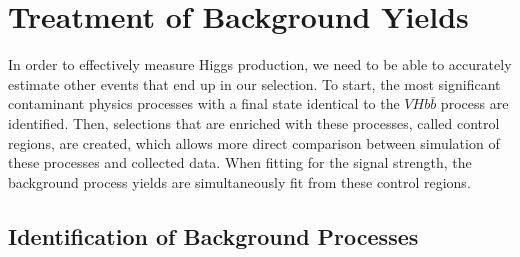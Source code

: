 \section{Treatment of Background Yields}

In order to effectively measure Higgs production,
we need to be able to accurately estimate other events
that end up in our selection.
To start, the most significant contaminant physics processes with a final state
identical to the $V\!Hb\bar{b}$ process are identified.
Then, selections that are enriched with these processes, called control regions, are created,
which allows more direct comparison between simulation of these processes and collected data.
When fitting for the signal strength, the background process yields are simultaneously fit
from these control regions.

\subsection{Identification of Background Processes}

